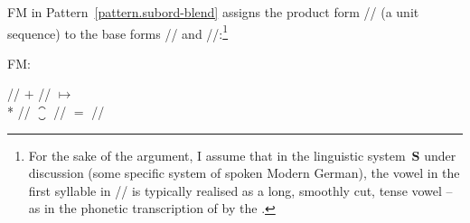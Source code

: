 \documentclass[output=paper
  ,nobabel
  ,draftmode
  ,colorlinks, citecolor=brown
]{langscibook}
\begin{document}
\largerpage[-1]
FM in Pattern \ref{pattern.subord-blend} assigns the
product form //
(a unit sequence) to the base forms // and //:\footnote{For the sake of the argument, I
assume that in the linguistic system $\mathbf{S}$ under discussion (some specific system of spoken Modern German), the
vowel in the first syllable in // is typically realised as a long, smoothly
cut, tense vowel – as in the phonetic transcription of \emph{} by the \citet[872]{dudenredaktion:2015:duden:aussprachewoerterbuch}.}
\begin{exe}
\ex \label{displayed.fm-naturlaub}\raggedright
\begin{labeledlist}{FM:}
\item[FM:] \raggedright // $+$ //
$↦$\\*{}
// $⁐$ //
$=$ //
\end{labeledlist}
\end{exe}
\pagebreak
\noindent
\end{document}
